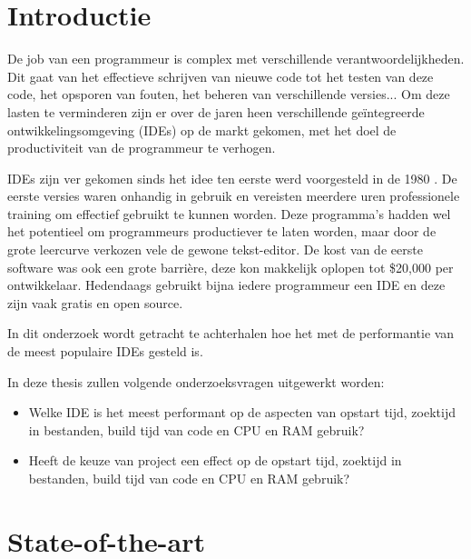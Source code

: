 
\section{Introductie} %
\label{sec:introductie}

De job van een programmeur is complex met verschillende verantwoordelijkheden. Dit gaat van het effectieve schrijven van nieuwe code tot het testen van deze code, het opsporen van fouten, het beheren van verschillende versies... Om deze lasten te verminderen zijn er over de jaren heen verschillende geïntegreerde ontwikkelingsomgeving (IDEs) op de markt gekomen, met het doel de productiviteit van de programmeur te verhogen. 

IDEs zijn ver gekomen sinds het idee ten eerste werd voorgesteld in de 1980 \autocite{Kline2005}. De eerste versies waren onhandig in gebruik en vereisten meerdere uren professionele training om effectief gebruikt te kunnen worden. Deze programma's hadden wel het potentieel om programmeurs productiever te laten worden, maar door de grote leercurve verkozen vele de gewone tekst-editor. De kost van de eerste software was ook een grote barrière, deze kon makkelijk oplopen tot \$20,000 per ontwikkelaar. Hedendaags gebruikt bijna iedere programmeur een IDE en deze zijn vaak gratis en open source. 
\newpage

In dit onderzoek wordt getracht te achterhalen hoe het met de performantie van de meest populaire IDEs gesteld is. 

In deze thesis zullen volgende onderzoeksvragen uitgewerkt worden:

\begin{itemize}
    \item Welke IDE is het meest performant op de aspecten van opstart tijd, zoektijd in bestanden, build tijd van code en CPU en RAM gebruik?
    \item Heeft de keuze van project een effect op de opstart tijd, zoektijd in bestanden, build tijd van code en CPU en RAM gebruik?
\end{itemize}



\section{State-of-the-art}
\label{sec:state-of-the-art}

